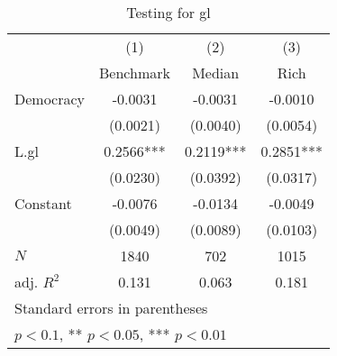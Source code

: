 \begin{table}[htbp]\centering
\def\sym#1{\ifmmode^{#1}\else\(^{#1}\)\fi}
\caption{Testing for gl \label{tab:regression6}}
\begin{tabular}{l*{3}{c}}
\hline\hline
            &\multicolumn{1}{c}{(1)}&\multicolumn{1}{c}{(2)}&\multicolumn{1}{c}{(3)}\\
            &\multicolumn{1}{c}{Benchmark}&\multicolumn{1}{c}{Median}&\multicolumn{1}{c}{Rich}\\
\hline
Democracy   &     -0.0031   &     -0.0031   &     -0.0010   \\
            &    (0.0021)   &    (0.0040)   &    (0.0054)   \\
[1em]
L.gl        &      0.2566***&      0.2119***&      0.2851***\\
            &    (0.0230)   &    (0.0392)   &    (0.0317)   \\
[1em]
Constant    &     -0.0076   &     -0.0134   &     -0.0049   \\
            &    (0.0049)   &    (0.0089)   &    (0.0103)   \\
\hline
\(N\)       &        1840   &         702   &        1015   \\
adj. \(R^{2}\)&       0.131   &       0.063   &       0.181   \\
\hline\hline
\multicolumn{4}{l}{\footnotesize Standard errors in parentheses}\\
\multicolumn{4}{l}{\footnotesize * \(p<0.1\), ** \(p<0.05\), *** \(p<0.01\)}\\
\end{tabular}
\end{table}

